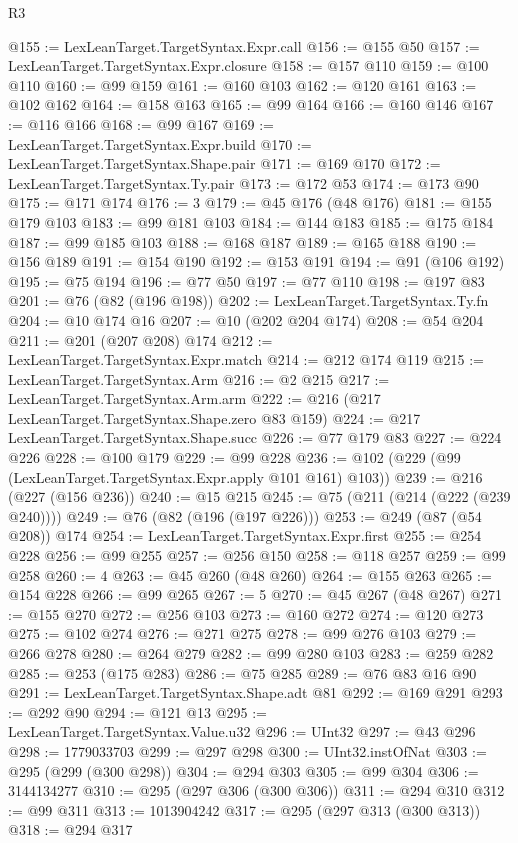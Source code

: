 \begin{lexlean}{R3}
\begin{coremodule}
@155 := LexLeanTarget.TargetSyntax.Expr.call
@156 := @155 @50
@157 := LexLeanTarget.TargetSyntax.Expr.closure
@158 := @157 @110
@159 := @100 @110
@160 := @99 @159
@161 := @160 @103
@162 := @120 @161
@163 := @102 @162
@164 := @158 @163
@165 := @99 @164
@166 := @160 @146
@167 := @116 @166
@168 := @99 @167
@169 := LexLeanTarget.TargetSyntax.Expr.build
@170 := LexLeanTarget.TargetSyntax.Shape.pair
@171 := @169 @170
@172 := LexLeanTarget.TargetSyntax.Ty.pair
@173 := @172 @53
@174 := @173 @90
@175 := @171 @174
@176 := 3
@179 := @45 @176 (@48 @176)
@181 := @155 @179 @103
@183 := @99 @181 @103
@184 := @144 @183
@185 := @175 @184
@187 := @99 @185 @103
@188 := @168 @187
@189 := @165 @188
@190 := @156 @189
@191 := @154 @190
@192 := @153 @191
@194 := @91 (@106 @192)
@195 := @75 @194
@196 := @77 @50
@197 := @77 @110
@198 := @197 @83
@201 := @76 (@82 (@196 @198))
@202 := LexLeanTarget.TargetSyntax.Ty.fn
@204 := @10 @174 @16
@207 := @10 (@202 @204 @174)
@208 := @54 @204
@211 := @201 (@207 @208) @174
@212 := LexLeanTarget.TargetSyntax.Expr.match
@214 := @212 @174 @119
@215 := LexLeanTarget.TargetSyntax.Arm
@216 := @2 @215
@217 := LexLeanTarget.TargetSyntax.Arm.arm
@222 := @216 (@217 LexLeanTarget.TargetSyntax.Shape.zero @83 @159)
@224 := @217 LexLeanTarget.TargetSyntax.Shape.succ
@226 := @77 @179 @83
@227 := @224 @226
@228 := @100 @179
@229 := @99 @228
@236 := @102 (@229 (@99 (LexLeanTarget.TargetSyntax.Expr.apply @101 @161) @103))
@239 := @216 (@227 (@156 @236))
@240 := @15 @215
@245 := @75 (@211 (@214 (@222 (@239 @240))))
@249 := @76 (@82 (@196 (@197 @226)))
@253 := @249 (@87 (@54 @208)) @174
@254 := LexLeanTarget.TargetSyntax.Expr.first
@255 := @254 @228
@256 := @99 @255
@257 := @256 @150
@258 := @118 @257
@259 := @99 @258
@260 := 4
@263 := @45 @260 (@48 @260)
@264 := @155 @263
@265 := @154 @228
@266 := @99 @265
@267 := 5
@270 := @45 @267 (@48 @267)
@271 := @155 @270
@272 := @256 @103
@273 := @160 @272
@274 := @120 @273
@275 := @102 @274
@276 := @271 @275
@278 := @99 @276 @103
@279 := @266 @278
@280 := @264 @279
@282 := @99 @280 @103
@283 := @259 @282
@285 := @253 (@175 @283)
@286 := @75 @285
@289 := @76 @83 @16 @90
@291 := LexLeanTarget.TargetSyntax.Shape.adt @81
@292 := @169 @291
@293 := @292 @90
@294 := @121 @13
@295 := LexLeanTarget.TargetSyntax.Value.u32
@296 := UInt32
@297 := @43 @296
@298 := 1779033703
@299 := @297 @298
@300 := UInt32.instOfNat
@303 := @295 (@299 (@300 @298))
@304 := @294 @303
@305 := @99 @304
@306 := 3144134277
@310 := @295 (@297 @306 (@300 @306))
@311 := @294 @310
@312 := @99 @311
@313 := 1013904242
@317 := @295 (@297 @313 (@300 @313))
@318 := @294 @317

\end{coremodule}
\end{lexlean}

